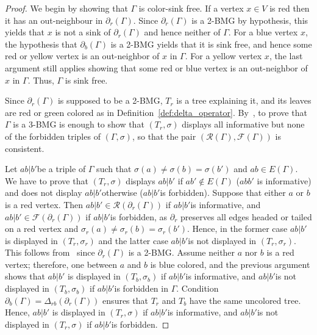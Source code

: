 \documentclass[final,3p,times]{elsarticle}
\begin{document}
\begin{proof}
We begin by showing that $\Gamma$ is color-sink free. If a vertex $x\in V$ is red then it has an out-neighbour in $\partial_{r}(\Gamma)$. Since $\partial_{r}(\Gamma)$ is a 2-BMG by hypothesis, this yields that $x$ is not a sink of $\partial_{r}(\Gamma)$ and hence neither of $\Gamma$. For a blue vertex $x$, the hypothesis that $\partial_b(\Gamma)$ is a 2-BMG yields that it is sink free, and hence some red or yellow vertex is an out-neighbor of $x$ in $\Gamma$. For a yellow vertex $x$, the last argument still applies showing that some red or blue vertex is an out-neighbor of $x$ in $\Gamma$. Thus, $\Gamma$ is sink free.

Since $\partial_{r}(\Gamma)$ is supposed to be a 2-BMG, $T_r$ is a tree explaining it, and its leaves are red or green colored as in Definition~\ref{def:delta_operator}. By~\cite[Proposition~2.3]{korchmaros2021quasi}, to prove that $\Gamma$ is a 3-BMG is enough to show that $(T_r,\sigma)$ displays all informative but none of the forbidden triples of $(\Gamma,\sigma)$, so that the pair $(\mathscr{R}(\Gamma),\mathscr{F}(\Gamma))$ is consistent.

Let $ab|b'$be a triple of $\Gamma$ such that $\sigma(a)\ne \sigma(b)=\sigma(b')$ and $ab\in E(\Gamma)$. We have to prove that $(T_r,\sigma)$ displays $ab|b'$ if $ab'\notin E(\Gamma)$ ($ abb'$ is informative) and does not display $ab|b'$otherwise ($ab|b'$is forbidden). Suppose that either $a$ or $b$ is a red vertex. Then $ab|b'\in \mathscr{R}(\partial_{r}(\Gamma))$ if $ab|b'$is informative, and $ab|b'\in \mathscr{F}(\partial_{r}(\Gamma))$ if $ab|b'$is forbidden, as $\partial_{r}$ preserves all edges headed or tailed on a red vertex and $\sigma_r(a)\ne \sigma_r(b)=\sigma_r(b')$. Hence, in the former case $ab|b'$ is displayed in $(T_r,\sigma_r)$ and the latter case $ab|b'$is not displayed in $(T_r,\sigma_r)$. This follows from~\cite[Proposition~2.3]{korchmaros2021quasi} since $\partial_{r}(\Gamma)$ is a 2-BMG. Assume neither $a$ nor $b$ is a red vertex; therefore, one between $a$ and $b$ is blue colored, and the previous argument shows that $ab|b'$ is displayed in $(T_b,\sigma_b)$ if $ab|b'$is informative, and $ab|b'$is not displayed in $(T_b,\sigma_b)$ if $ab|b'$is forbidden in $\Gamma$. Condition $\partial_b(\Gamma)=\Delta_{rb}(\partial_r(\Gamma))$ ensures that $T_r$ and $T_b$ have the same uncolored tree. Hence, $ab|b'$ is displayed in $(T_r,\sigma)$ if $ab|b'$is informative, and $ab|b'$is not displayed in $(T_r,\sigma)$ if $ab|b'$is forbidden.
\end{proof}
\end{document}
